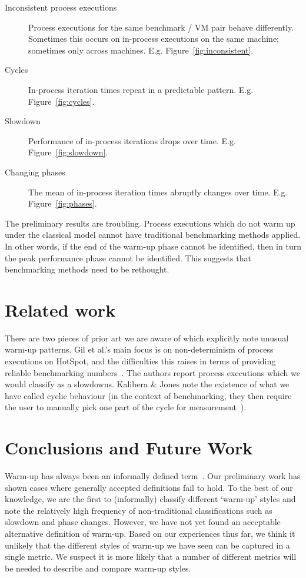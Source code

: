 \documentclass[preprint]{sigplanconf}
\newcommand{\kalibera}{Kalibera \& Jones\xspace}
\begin{document}
\begin{description}
\item[Inconsistent process executions] Process executions for the same
benchmark / VM pair behave differently. Sometimes this occurs on in-process
executions on the same machine; sometimes only across machines. E.g.
Figure~\ref{fig:inconsistent}.
\item[Cycles] In-process iteration times repeat in a predictable pattern. E.g.
Figure~\ref{fig:cycles}.
\item[Slowdown] Performance of in-process iterations drops over time. E.g.
Figure~\ref{fig:slowdown}.
\item[Changing phases] The mean of in-process iteration times abruptly changes
over time. E.g. Figure~\ref{fig:phases}.
\end{description}

The preliminary results are troubling. Process executions which do not warm up
under the classical model cannot have traditional benchmarking methods
applied. In other words, if the end of the warm-up phase cannot be identified,
then in turn the peak performance phase cannot be identified. This suggests
that benchmarking methods need to be rethought.


\section{Related work}

There are two pieces of prior art we are aware of which explicitly note unusual warm-up
patterns. Gil et al.'s main focus is on non-determinism of process executions on
HotSpot, and the difficulties this raises in terms of providing reliable
benchmarking numbers~\cite{gil11microbenchmark}. The authors report
process executions which we would classify as a slowdowns. \kalibera note the
existence of what we have called cyclic behaviour (in the context of benchmarking,
they then require the user to
manually pick one part of the cycle for measurement~\cite{kalibera13rigorous}).

\section{Conclusions and Future Work}
\label{sec:conclusion}

Warm-up has always been an informally defined term~\cite{seaton15phd}. Our
preliminary work has shown cases where generally accepted definitions fail to hold.
To the best of our knowledge, we are the first to (informally) classify different
`warm-up' styles and note the relatively high frequency of non-traditional
classifications such as slowdown and phase changes.
However, we have not yet found an acceptable alternative definition of warm-up.
Based on our experiences thus far, we think it unlikely that the different
styles of warm-up we have seen can be captured in a single metric. We suspect it
is more likely that a number of different metrics will be needed to describe and
compare warm-up styles.
\end{document}
